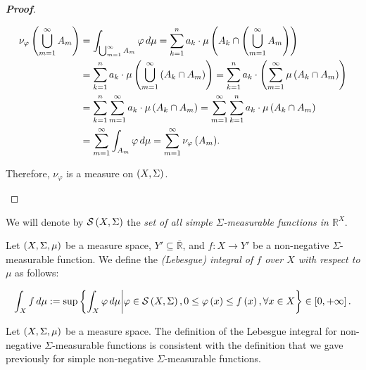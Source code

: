 \begin{proposition}
\begin{proof}[\rm\textbf{Proof}]
\begin{enumerate}
      \begin{equation}
        \begin{split}
          \nu_\varphi\left(\bigcup_{m=1}^{\infty}{A_m}\right)& =\int_{\bigcup_{m=1}^{\infty}{A_m}}{\varphi\,d\mu} =\sum_{k=1}^{n}{a_k\cdot\mu\left(A_k\cap\left(\bigcup_{m=1}^{\infty}{A_m}\right)\right)}\\
          & =\sum_{k=1}^{n}{a_k\cdot\mu\left(\bigcup_{m=1}^{\infty}{\left(A_k\cap A_m\right)}\right)}=\sum_{k=1}^{n}{a_k\cdot\left(\sum_{m=1}^{\infty}{\mu\left(A_k\cap A_m\right)}\right)}\\
          & =\sum_{k=1}^{n}{\sum_{m=1}^{\infty}{a_k\cdot\mu\left(A_k\cap A_m\right)}}=\sum_{m=1}^{\infty}{\sum_{k=1}^{n}{a_k\cdot\mu\left(A_k\cap A_m\right)}}\\
          & =\sum_{m=1}^{\infty}{\int_{A_m}{\varphi\,d\mu}}=\sum_{m=1}^{\infty}{\nu_\varphi\left(A_m\right)}.
        \end{split}
      \end{equation}

      Therefore, $\nu_\varphi$ is a measure on $\left(X,\Sigma\right)$.
    \end{enumerate}
  \end{proof}
\end{proposition}

We will denote by $\mathcal{S}\left(X,\Sigma\right)$ the \emph{set of all simple $\Sigma$-measurable functions in $\mathbb{R}^X$}.

\begin{definition}
  Let $\left(X,\Sigma,\mu\right)$ be a measure space, $Y'\subseteq\overline{\mathbb{R}}$, and $f:X\rightarrow Y'$ be a non-negative $\Sigma$-measurable function. We define the \emph{(Lebesgue) integral of $f$ over $X$ with respect to $\mu$} as follows:

  \begin{equation}
    \int_{X}{f\,d\mu}:=\sup\left\{\int_{X}{\varphi\,d\mu}\middle|\varphi\in\mathcal{S}\left(X,\Sigma\right),0\leq\varphi\left(x\right)\leq f\left(x\right),\forall x\in X\right\}\in\left[0,+\infty\right].
  \end{equation}
\end{definition}

\begin{remark}
  Let $\left(X,\Sigma,\mu\right)$ be a measure space. The definition of the Lebesgue integral for non-negative $\Sigma$-measurable functions is consistent with the definition that we gave previously for simple non-negative $\Sigma$-measurable functions.
\end{remark}

